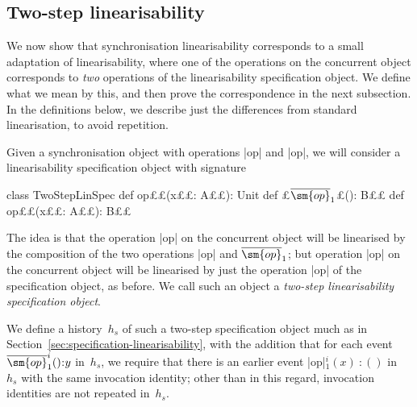 
\subsection{Two-step linearisability}


We now show that synchronisation linearisability corresponds to a small
adaptation of linearisability, where one of the operations on the
concurrent object corresponds to \emph{two} operations of the linearisability
specification object.  We define what we mean by this, and then prove the
correspondence in the next subsection.  In the definitions below, we describe
just the differences from standard linearisation, to avoid repetition.

Given a synchronisation object with operations |op| and |op|,
we will consider a linearisability specification object with signature
%
\begin{scala}
class TwoStepLinSpec{
  def op££(x££: A££): Unit
  def £$\overline{\sm{op}}_1$£(): B££
  def op££(x££: A££): B££
}
\end{scala}
%
The idea is that the operation |op| on the concurrent object will be
linearised by the composition of the two operations |op| and
$\overline{\sm{op}}_1$; but operation |op| on the concurrent object will be
linearised by just the operation |op| of the specification object, as
before.  We call such an object a \emph{two-step linearisability specification
  object}. 

We define a history~$h_s$ of such a two-step specification object much as in
Section~\ref{sec:specification-linearisability}, with the addition that for
each event $\overline{\sm{op}}_1^i()\::y$ in~$h_s$, we require that there is
an earlier event |op|$_1^i(x)\::()$ in~$h_s$ with the same invocation
identity; other than in this regard, invocation identities are not repeated
in~$h_s$.

